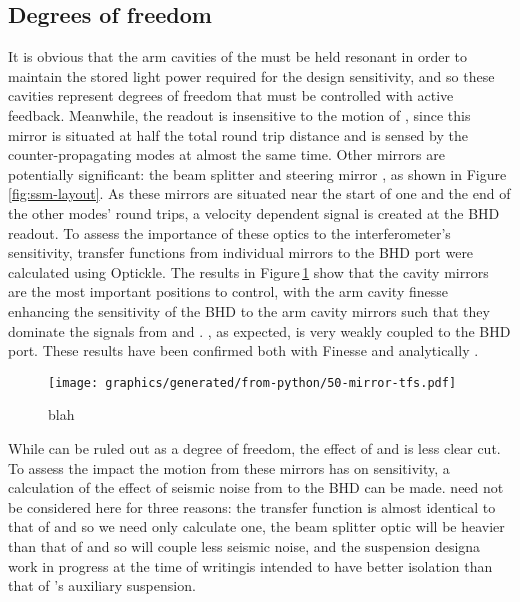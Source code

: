 \subsection{\label{sec:ssm-dofs}Degrees of freedom}
It is obvious that the arm cavities of the \SSM{} must be held resonant in order to maintain the  stored light power required for the design sensitivity, and so these cavities represent degrees of freedom that must be controlled with active feedback. Meanwhile, the readout is insensitive to the motion of \MINT{}, since this mirror is situated at half the total round trip distance and is sensed by the counter-propagating modes at almost the same time. Other mirrors are potentially significant: the beam splitter \MSIX{} and steering mirror \MSEVEN{}, as shown in Figure\,\ref{fig:ssm-layout}. As these mirrors are situated near the start of one and the end of the other modes' round trips, a velocity dependent signal is created at the \gls{BHD} readout. To assess the importance of these optics to the interferometer's \LMINUS{} sensitivity, transfer functions from individual mirrors to the \gls{BHD} port were calculated using Optickle. The results in Figure\,\ref{fig:ssm-mirror-tfs} show that the cavity mirrors are the most important positions to control, with the arm cavity finesse enhancing the sensitivity of the \gls{BHD} to the arm cavity mirrors such that they dominate the signals from \MSIX{} and \MSEVEN{}. \MINT{}, as expected, is very weakly coupled to the \gls{BHD} port. These results have been confirmed both with Finesse and analytically \cite{Graefke2015}.

\begin{figure}
  \centering
  \texttt{[image: graphics/generated/from-python/50-mirror-tfs.pdf]}
  \caption{\label{fig:ssm-mirror-tfs}blah}
\end{figure}

While \MINT{} can be ruled out as a degree of freedom, the effect of \MSIX{} and \MSEVEN{} is less clear cut. To assess the impact the motion from these mirrors has on \LMINUS{} sensitivity, a calculation of the effect of seismic noise from \MSEVEN{} to the \gls{BHD} can be made. \MSIX{} need not be considered here for three reasons: the transfer function is almost identical to that of \MSEVEN{} and so we need only calculate one, the beam splitter optic will be heavier than that of \MSEVEN{} and so will couple less seismic noise, and the suspension design\textemdash a work in progress at the time of writing\textemdash is intended to have better isolation than that of \MSEVEN{}'s auxiliary suspension.

